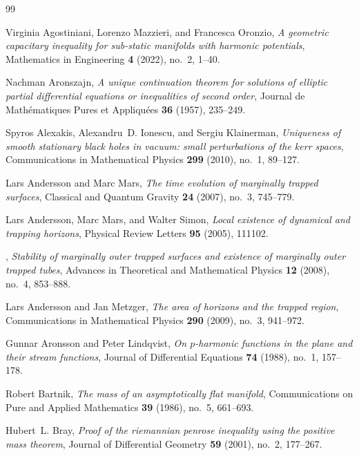 \documentclass[12pt]{article}
\theoremstyle{plain}
\theoremstyle{definition}
\theoremstyle{remark}
\begin{document}
\newpage
\begin{thebibliography}{99}

Virginia Agostiniani, Lorenzo Mazzieri, and Francesca Oronzio, \emph{A
  geometric capacitary inequality for sub-static manifolds with harmonic
  potentials}, Mathematics in Engineering \textbf{4} (2022), no.~2, 1--40.

Nachman Aronszajn, \emph{A unique continuation theorem for solutions of elliptic partial differential equations or inequalities of second order}, Journal de Math\'ematiques Pures et Appliqu\'ees \textbf{36} (1957), 235--249.

Spyros Alexakis, Alexandru~D. Ionescu, and Sergiu Klainerman, \emph{Uniqueness
  of smooth stationary black holes in vacuum: small perturbations of the kerr
  spaces}, Communications in Mathematical Physics \textbf{299} (2010), no.~1,
  89--127.

Lars Andersson and Marc Mars, \emph{The time evolution of marginally trapped
  surfaces}, Classical and Quantum Gravity \textbf{24} (2007), no.~3, 745--779.

Lars Andersson, Marc Mars, and Walter Simon, \emph{Local existence of dynamical
  and trapping horizons}, Physical Review Letters \textbf{95} (2005), 111102.

\bysame, \emph{Stability of marginally outer trapped surfaces and existence of
  marginally outer trapped tubes}, Advances in Theoretical and Mathematical
  Physics \textbf{12} (2008), no.~4, 853--888.

Lars Andersson and Jan Metzger, \emph{The area of horizons and the trapped
  region}, Communications in Mathematical Physics \textbf{290} (2009), no.~3,
  941--972.

Gunnar Aronsson and Peter Lindqvist, \emph{On $p$-harmonic functions in the
  plane and their stream functions}, Journal of Differential Equations
  \textbf{74} (1988), no.~1, 157--178.

Robert Bartnik, \emph{The mass of an asymptotically flat manifold},
  Communications on Pure and Applied Mathematics \textbf{39} (1986), no.~5,
  661--693.

Hubert~L. Bray, \emph{Proof of the riemannian penrose inequality using the
  positive mass theorem}, Journal of Differential Geometry \textbf{59} (2001),
  no.~2, 177--267.


\end{thebibliography}
\end{document}
